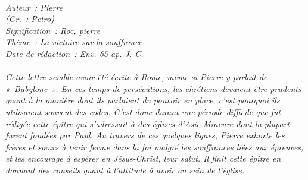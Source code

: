 \BFont
\noindent\hrulefill
{\footnotesize
\textit{
\bigskip
{\centering{}
\\Auteur~: Pierre
\\(Gr.~: Petro)
\\Signification~: Roc, pierre
\\Thème~: La victoire sur la souffrance
\\Date de rédaction~: Env. 65 ap. J.-C.\\}
}
\textit{
\\Cette lettre semble avoir été écrite à Rome, même si Pierre y parlait de «~Babylone~». En ces temps de persécutions, les chrétiens devaient être prudents quant à la manière dont ils parlaient du pouvoir en place, c'est pourquoi ils utilisaient souvent des codes. C'est donc durant une période difficile que fut rédigée cette épître qui s'adressait à des églises d'Asie Mineure dont la plupart furent fondées par Paul. Au travers de ces quelques lignes, Pierre exhorte les frères et sœurs à tenir ferme dans la foi malgré les souffrances liées aux épreuves, et les encourage à espérer en Jésus-Christ, leur salut. Il finit cette épître en donnant des conseils quant à l'attitude à avoir au sein de l'église.\bigskip
}
}
\par\nobreak\noindent\hrulefill

